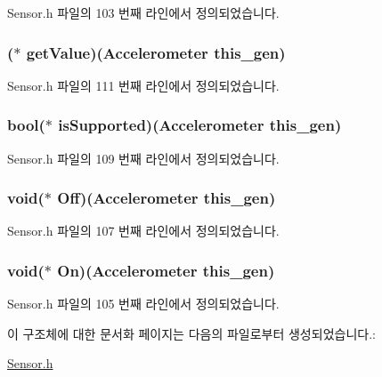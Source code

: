 Sensor.\-h 파일의 103 번째 라인에서 정의되었습니다.

\hypertarget{struct___accelerometer_a8c75dfb5dbc8f9da5ea69ef2fb597185}{
\subsubsection[{get\-Value}]{($\ast$  get\-Value)({\bf Accelerometer} this\-\_\-gen)}}\label{struct___accelerometer_a8c75dfb5dbc8f9da5ea69ef2fb597185}


Sensor.\-h 파일의 111 번째 라인에서 정의되었습니다.

\hypertarget{struct___accelerometer_a0c01b8a5a915f39afb4429cbe3ee6d2c}{
\subsubsection[{is\-Supported}]{\setlength{\rightskip}{0pt plus 5cm}bool($\ast$  is\-Supported)({\bf Accelerometer} this\-\_\-gen)}}\label{struct___accelerometer_a0c01b8a5a915f39afb4429cbe3ee6d2c}


Sensor.\-h 파일의 109 번째 라인에서 정의되었습니다.

\hypertarget{struct___accelerometer_a6bee74ed7ad41e18037dd35d10e5ca65}{
\subsubsection[{Off}]{\setlength{\rightskip}{0pt plus 5cm}void($\ast$  Off)({\bf Accelerometer} this\-\_\-gen)}}\label{struct___accelerometer_a6bee74ed7ad41e18037dd35d10e5ca65}


Sensor.\-h 파일의 107 번째 라인에서 정의되었습니다.

\hypertarget{struct___accelerometer_ad916cc9a71168f051a7cdfaf8da436ff}{
\subsubsection[{On}]{\setlength{\rightskip}{0pt plus 5cm}void($\ast$  On)({\bf Accelerometer} this\-\_\-gen)}}\label{struct___accelerometer_ad916cc9a71168f051a7cdfaf8da436ff}


Sensor.\-h 파일의 105 번째 라인에서 정의되었습니다.



이 구조체에 대한 문서화 페이지는 다음의 파일로부터 생성되었습니다.\-:\begin{DoxyCompactItemize}
\item 
\hyperlink{_sensor_8h}{Sensor.\-h}\end{DoxyCompactItemize}
